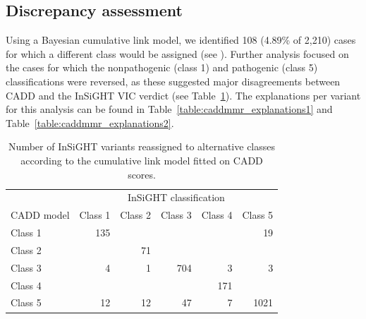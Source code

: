 \subsection{Discrepancy assessment}
Using a Bayesian cumulative link model, we identified 108 (4.89\% of 2,210) cases for which a different class would be assigned (see \textsl{}).
Further analysis focused on the cases for which the nonpathogenic (class 1) and pathogenic (class 5) classifications were reversed, as these suggested major disagreements between CADD and the InSiGHT VIC verdict (see Table~\ref{table:caddmmr_reassigned}).
The explanations per variant for this analysis can be found in Table~\ref{table:caddmmr_explanations1} and Table~\ref{table:caddmmr_explanations2}.

\begin{table}[htb]
\begin{tabular}{ l r r r r r }
  ~ & \multicolumn{5}{c}{InSiGHT classification} \\\cline{2-6}
  CADD model & Class 1 & Class 2 & Class 3 & Class 4 & Class 5 \\
  \hline
  Class 1 & 135 & & & & 19 \\
  Class 2 & & 71 & & & \\
  Class 3 & 4 & 1 & 704 & 3 & 3 \\
  Class 4 & & & & 171 & \\
  Class 5 & 12 & 12 & 47 & 7 & 1021 \\
  \hline
\end{tabular}
\caption[Number of InSiGHT variants reassigned]{\label{table:caddmmr_reassigned} Number of InSiGHT variants reassigned to alternative classes according to the cumulative link model fitted on CADD scores.}
\end{table}

\linespread{1.00} %

